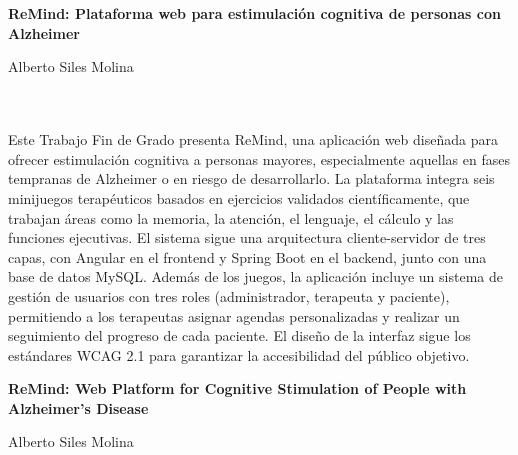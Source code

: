 \chapter*{}
\thispagestyle{empty}
\cleardoublepage

\thispagestyle{empty}





\cleardoublepage
\thispagestyle{empty}

\begin{center}
{\large\bfseries ReMind: Plataforma web para estimulación cognitiva de personas con Alzheimer}\\
\end{center}
\begin{center}
Alberto Siles Molina\\
\end{center}

\vspace{0.7cm}
\\

\vspace{0.7cm}
\\
Este Trabajo Fin de Grado presenta ReMind, una aplicación web diseñada para ofrecer estimulación cognitiva a personas mayores, especialmente aquellas en fases tempranas de Alzheimer o en riesgo de desarrollarlo. La plataforma integra seis minijuegos terapéuticos basados en ejercicios validados científicamente, que trabajan áreas como la memoria, la atención, el lenguaje, el cálculo y las funciones ejecutivas. El sistema sigue una arquitectura cliente-servidor de tres capas, con Angular en el frontend y Spring Boot en el backend, junto con una base de datos MySQL. Además de los juegos, la aplicación incluye un sistema de gestión de usuarios con tres roles (administrador, terapeuta y paciente), permitiendo a los terapeutas asignar agendas personalizadas y realizar un seguimiento del progreso de cada paciente. El diseño de la interfaz sigue los estándares WCAG 2.1 para garantizar la accesibilidad del público objetivo.\\

\cleardoublepage


\thispagestyle{empty}


\begin{center}
{\large\bfseries ReMind: Web Platform for Cognitive Stimulation of People with Alzheimer's Disease}\\
\end{center}
\begin{center}
Alberto Siles Molina\\
\end{center}

